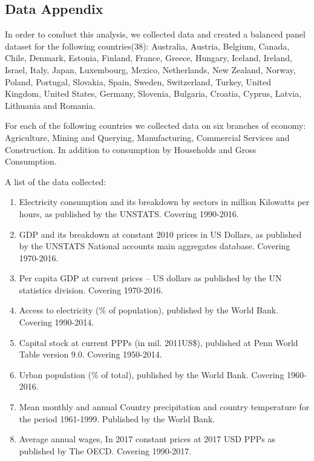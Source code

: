 \documentclass[14pt,oneside]{amsart}
\begin{document}
\bigskip


\newpage
\setcounter{table}{0} \renewcommand{\thetable}{B\arabic{table}}
\begin{appendices}


\section{Data Appendix}

In order to conduct this analysis, we collected data and created a balanced panel dataset for the following countries(38): Australia, Austria, Belgium, Canada, Chile, Denmark, Estonia, Finland, France, Greece, Hungary, Iceland, Ireland, Israel, Italy, Japan, Luxembourg, Mexico, Netherlands, New Zealand, Norway, Poland, Portugal, Slovakia, Spain, Sweden, Switzerland, Turkey, United Kingdom, United States, Germany, Slovenia, Bulgaria, Croatia, Cyprus, Latvia, Lithuania and Romania.

For each of the following countries we collected data on six branches of economy: Agriculture, Mining and Querying, Manufacturing, Commercial
Services and Construction. In addition to consumption by Households and Gross Consumption.

A list of the data collected:

\begin{enumerate}
  \item Electricity consumption and its breakdown by sectors in million Kilowatts per hours, as published by the UNSTATS. Covering 1990-2016.
  \item GDP and its breakdown at constant 2010 prices in US Dollars, as published by the UNSTATS National accounts main aggregates database. Covering 1970-2016.
  \item Per capita GDP at current prices – US dollars as published by the UN statistics division. Covering 1970-2016.
  \item Access to electricity (\% of population), published by the World Bank. Covering 1990-2014.
  \item Capital stock at current PPPs (in mil. 2011US\$), published at Penn World Table version 9.0. Covering 1950-2014.
  \item Urban population (\% of total), published by the World Bank. Covering 1960-2016.
  \item Mean monthly and annual Country precipitation and country temperature for the period 1961-1999. Published by the World Bank.
  \item Average annual wages, In 2017 constant prices at 2017 USD PPPs as published by The OECD. Covering 1990-2017.
\end{enumerate}


\end{appendices}
\end{document}
